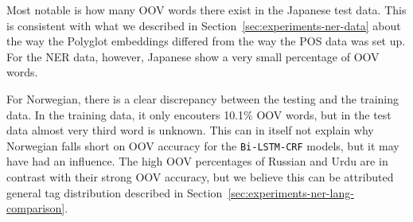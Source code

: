 Most notable is how many OOV words there exist in the Japanese test data.
This is consistent with what we described in
Section~\ref{sec:experiments-ner-data} about the way the Polyglot embeddings
differed from the way the POS data was set up. For the NER data, however,
Japanese show a very small percentage of OOV words.

For Norwegian, there is a clear discrepancy between the testing and the training
data. In the training data, it only encouters 10.1\% OOV words, but in the test
data almost very third word is unknown. This can in itself not explain why
Norwegian falls short on OOV accuracy for the \texttt{Bi-LSTM-CRF} models, but
it may have had an influence. The high OOV percentages of Russian and Urdu are in
contrast with their strong OOV accuracy, but we believe this can be attributed
general tag distribution described in
Section~\ref{sec:experiments-ner-lang-comparison}.

